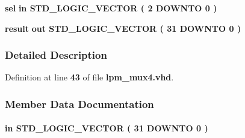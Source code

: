 \begin{DoxyCompactItemize}
\item 
{\bf sel}  {\bfseries {\bfseries \textcolor{keywordflow}{in}\textcolor{vhdlchar}{ }}} {\bfseries \textcolor{comment}{S\+T\+D\+\_\+\+L\+O\+G\+I\+C\+\_\+\+V\+E\+C\+T\+OR}\textcolor{vhdlchar}{ }\textcolor{vhdlchar}{(}\textcolor{vhdlchar}{ }\textcolor{vhdlchar}{ } \textcolor{vhdldigit}{2} \textcolor{vhdlchar}{ }\textcolor{keywordflow}{D\+O\+W\+N\+TO}\textcolor{vhdlchar}{ }\textcolor{vhdlchar}{ } \textcolor{vhdldigit}{0} \textcolor{vhdlchar}{ }\textcolor{vhdlchar}{)}\textcolor{vhdlchar}{ }} 
\item 
{\bf result}  {\bfseries {\bfseries \textcolor{keywordflow}{out}\textcolor{vhdlchar}{ }}} {\bfseries \textcolor{comment}{S\+T\+D\+\_\+\+L\+O\+G\+I\+C\+\_\+\+V\+E\+C\+T\+OR}\textcolor{vhdlchar}{ }\textcolor{vhdlchar}{(}\textcolor{vhdlchar}{ }\textcolor{vhdlchar}{ } \textcolor{vhdldigit}{31} \textcolor{vhdlchar}{ }\textcolor{keywordflow}{D\+O\+W\+N\+TO}\textcolor{vhdlchar}{ }\textcolor{vhdlchar}{ } \textcolor{vhdldigit}{0} \textcolor{vhdlchar}{ }\textcolor{vhdlchar}{)}\textcolor{vhdlchar}{ }} 
\end{DoxyCompactItemize}


\subsubsection{Detailed Description}


Definition at line {\bf 43} of file {\bf lpm\+\_\+mux4.\+vhd}.



\subsubsection{Member Data Documentation}
\paragraph[{data0x}]{ {\bfseries \textcolor{keywordflow}{in}\textcolor{vhdlchar}{ }} {\bfseries \textcolor{comment}{S\+T\+D\+\_\+\+L\+O\+G\+I\+C\+\_\+\+V\+E\+C\+T\+OR}\textcolor{vhdlchar}{ }\textcolor{vhdlchar}{(}\textcolor{vhdlchar}{ }\textcolor{vhdlchar}{ } \textcolor{vhdldigit}{31} \textcolor{vhdlchar}{ }\textcolor{keywordflow}{D\+O\+W\+N\+TO}\textcolor{vhdlchar}{ }\textcolor{vhdlchar}{ } \textcolor{vhdldigit}{0} \textcolor{vhdlchar}{ }\textcolor{vhdlchar}{)}\textcolor{vhdlchar}{ }} \hspace{0.3cm}{\ttfamily [Port]}}\label{classlpm__mux4_ab2010496716bafb50a24dcce54c4d05f}


